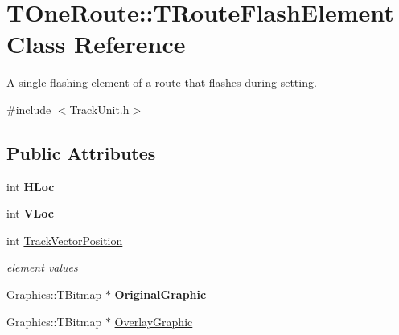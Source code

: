 \hypertarget{class_t_one_route_1_1_t_route_flash_element}{}\section{T\+One\+Route\+:\+:T\+Route\+Flash\+Element Class Reference}
\label{class_t_one_route_1_1_t_route_flash_element}


A single flashing element of a route that flashes during setting.  




{\ttfamily \#include $<$Track\+Unit.\+h$>$}

\subsection*{Public Attributes}
\begin{DoxyCompactItemize}
\item 
\mbox{\label{class_t_one_route_1_1_t_route_flash_element_a8cf67aa3834691980c671c4dd1502945}} 
int {\bfseries H\+Loc}
\item 
\mbox{\label{class_t_one_route_1_1_t_route_flash_element_a755fdeb7549ed1764d0c8d97e085e940}} 
int {\bfseries V\+Loc}
\item 
\mbox{\label{class_t_one_route_1_1_t_route_flash_element_ac74a501ef76bca88e523be8b80af9d4c}} 
int \mbox{\hyperlink{class_t_one_route_1_1_t_route_flash_element_ac74a501ef76bca88e523be8b80af9d4c}{Track\+Vector\+Position}}
\begin{DoxyCompactList}\small\item\em element values \end{DoxyCompactList}\item 
\mbox{\label{class_t_one_route_1_1_t_route_flash_element_ae726a745a5d6760f7cfff05f90392f24}} 
Graphics\+::\+T\+Bitmap $\ast$ {\bfseries Original\+Graphic}
\item 
Graphics\+::\+T\+Bitmap $\ast$ \mbox{\hyperlink{class_t_one_route_1_1_t_route_flash_element_a9728c9fe83d991d41596efa2cf07129f}{Overlay\+Graphic}}
\end{DoxyCompactItemize}


